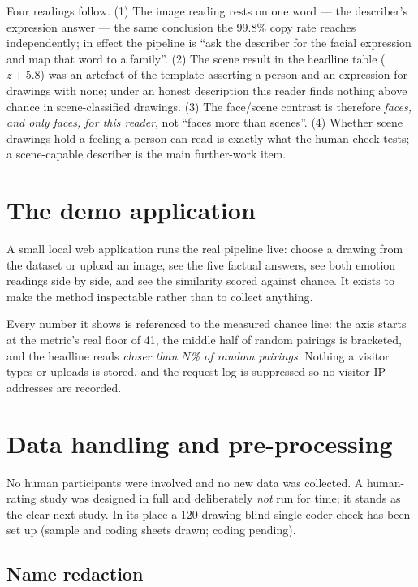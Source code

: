 \documentclass[11pt,a4paper]{article}
\newcommand{\say}[1]{\textit{\color{soft}#1}}
\begin{document}
Four readings follow. (1) The image reading rests on one word --- the describer's expression answer
--- the same conclusion the 99.8\% copy rate reaches independently; in effect the pipeline is ``ask
the describer for the facial expression and map that word to a family''. (2) The scene result in
the headline table ($z{+}5.8$) was an artefact of the template asserting a person and an expression
for drawings with none; under an honest description this reader finds nothing above chance in
scene-classified drawings. (3) The face/scene contrast is therefore \emph{faces, and only faces, for
this reader}, not ``faces more than scenes''. (4) Whether scene drawings hold a feeling a person can
read is exactly what the human check tests; a scene-capable describer is the main further-work item.

\section{The demo application}

A small local web application runs the real pipeline live: choose a drawing from the dataset or
upload an image, see the five factual answers, see both emotion readings side by side, and see the
similarity scored against chance. It exists to make the method inspectable rather than to collect
anything.

Every number it shows is referenced to the measured chance line: the axis starts at the metric's real
floor of 41, the middle half of random pairings is bracketed, and the headline reads \say{closer than
$N$\% of random pairings}. Nothing a visitor types or uploads is stored, and the request log is
suppressed so no visitor IP addresses are recorded.

\section{Data handling and pre-processing}

No human participants were involved and no new data was collected. A human-rating study was designed
in full and deliberately \emph{not} run for time; it stands as the clear next study. In its place a
120-drawing blind single-coder check has been set up (sample and coding sheets drawn; coding pending).

\subsection{Name redaction}
\end{document}
